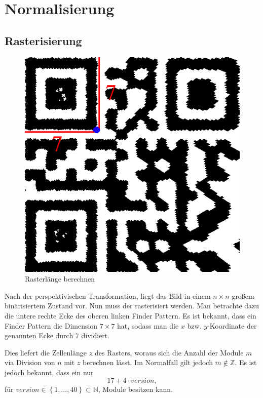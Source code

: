 \chapter{Normalisierung}
\section{Rasterisierung}

\begin{figure}
  \vspace{-20pt}
  \begin{center}
    \includegraphics[scale=0.25]{images/Gitter_step.png}
  \end{center}
  \vspace{-10pt}
  \label{fig:raster-qrcode}\caption{Rasterlänge berechnen}
  \vspace{-10pt}
\end{figure}

Nach der perspektivischen Transformation, liegt das Bild in einem $n\times n$ großem binärisiertem Zustand vor. Nun muss der \QRCode rasterisiert werden. 
Man betrachte dazu die untere rechte Ecke des oberen linken Finder Pattern. Es ist bekannt, dass ein Finder Pattern die Dimension $7 \times 7$ hat,
sodass man die $x$ bzw. $y$-Koordinate der genannten Ecke durch $7$ dividiert.

Dies liefert die Zellenlänge $z$ des Rasters,
woraus sich die Anzahl der Module $m$ via Division von $n$ mit $z$ berechnen lässt. Im Normalfall gilt jedoch $m \notin \mathbb{Z}$.
Es ist jedoch bekannt, dass ein \QRCode nur 
\begin {equation*}
	17 + 4 \cdot version,
\end{equation*}
für $version \in \left\{1, ..., 40\right\} \subset \mathbb{N}$, Module besitzen kann.

